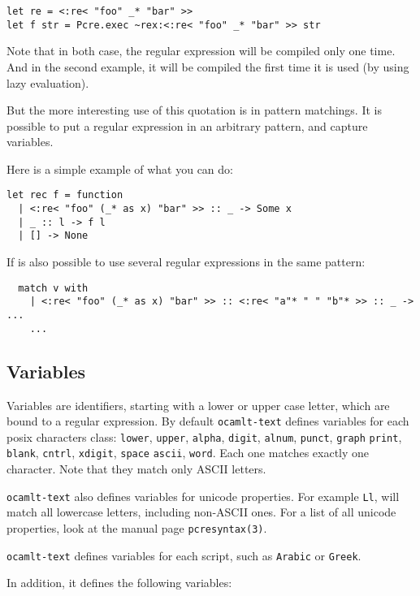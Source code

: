 \documentclass{article}
\newcommand{\oct}{\texttt{ocamlt-text}\xspace}
\begin{document}
\begin{verbatim}
let re = <:re< "foo" _* "bar" >>
let f str = Pcre.exec ~rex:<:re< "foo" _* "bar" >> str
\end{verbatim}

Note that in both case, the regular expression will be compiled only
one time. And in the second example, it will be compiled the first
time it is used (by using lazy evaluation).

But the more interesting use of this quotation is in pattern
matchings. It is possible to put a regular expression in an arbitrary
pattern, and capture variables.

Here is a simple example of what you can do:

\begin{verbatim}
let rec f = function
  | <:re< "foo" (_* as x) "bar" >> :: _ -> Some x
  | _ :: l -> f l
  | [] -> None
\end{verbatim}

If is also possible to use several regular expressions in the same
pattern:

\begin{verbatim}
  match v with
    | <:re< "foo" (_* as x) "bar" >> :: <:re< "a"* " " "b"* >> :: _ -> ...
    ...
\end{verbatim}

\subsection{Variables}

Variables are identifiers, starting with a lower or upper case letter,
which are bound to a regular expression. By default \oct defines
variables for each posix characters class: \texttt{lower},
\texttt{upper}, \texttt{alpha}, \texttt{digit}, \texttt{alnum},
\texttt{punct}, \texttt{graph} \texttt{print}, \texttt{blank},
\texttt{cntrl}, \texttt{xdigit}, \texttt{space} \texttt{ascii},
\texttt{word}. Each one matches exactly one character. Note that they
match only ASCII letters.

\oct also defines variables for unicode properties. For example
\texttt{Ll}, will match all lowercase letters, including non-ASCII
ones. For a list of all unicode properties, look at the manual page
\texttt{pcresyntax(3)}.

\oct defines variables for each script, such as \texttt{Arabic} or
\texttt{Greek}.

In addition, it defines the following variables:
\end{document}

